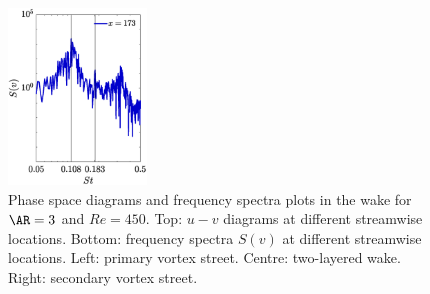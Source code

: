 \begin{figure}
\includegraphics[width=0.328\textwidth]{./fig/appendix/Spec_AR3_Re450_c.eps}
\caption{Phase space diagrams and frequency spectra plots in the wake for $\AR=3$ and $Re=450$. Top: $u-v$ diagrams at different streamwise locations. Bottom: frequency spectra $S(v)$ at different streamwise locations. Left: primary vortex street. Centre: two-layered wake. Right: secondary vortex street.}
\label{fig:wake_AR3}
\end{figure}


